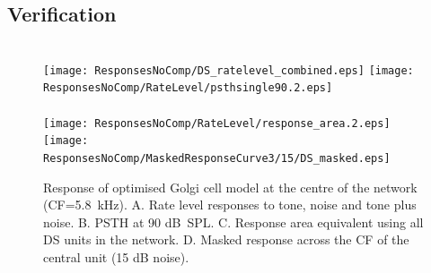 

\clearpage
\subsection{Verification}    \label{sec:DS:verification}


\begin{figure}[htb]
\hspace{0.5\textwidth}\hfill\\
\texttt{[image: ResponsesNoComp/DS\_ratelevel\_combined.eps]}%
\texttt{[image: ResponsesNoComp/RateLevel/psthsingle90.2.eps]}\\
\hspace{0.5\textwidth}\hfill\\
\texttt{[image: ResponsesNoComp/RateLevel/response\_area.2.eps]}%
\texttt{[image: ResponsesNoComp/MaskedResponseCurve3/15/DS\_masked.eps]}\\
\caption[Optimised DS cell model responses]{Response of optimised Golgi cell model at the centre of the network (CF=5.8~kHz). A. Rate level responses to tone, noise and tone plus noise. B. PSTH at 90 dB~SPL.  C. Response area equivalent using all DS units in the network. D. Masked response across the CF of the central unit (15 dB noise).} \label{fig:DS_verification}
\end{figure}


